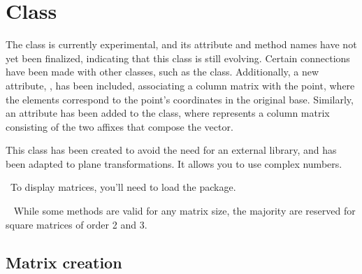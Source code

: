 \newpage\section{Class  } %
\label{sec:matrices}

The  class is currently experimental, and its attribute and method names have not yet been finalized, indicating that this class is still evolving. Certain connections have been made with other classes, such as the  class. Additionally, a new attribute, , has been included, associating a column matrix with the point, where the elements correspond to the point's coordinates in the original base. Similarly, an attribute has been added to the  class, where  represents a column matrix consisting of the two affixes that compose the vector.

This  class has been created to avoid the need for an external library, and has been adapted to plane transformations. It allows you to use complex numbers.

\lefthand\ To display matrices, you'll need to load the  package.

{\color{red}\lefthand\ } While some methods are valid for any matrix size, the majority are reserved for square matrices of order 2 and 3.


\subsection{Matrix creation} %
\label{sub:matrix_creation}

